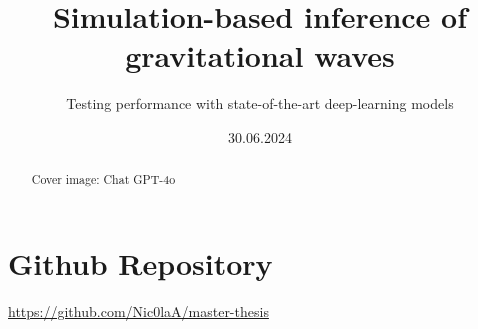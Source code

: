 \documentclass[ds,nofirstcompanypicture]{mscthesis}
\title{Simulation-based inference of gravitational waves}
\subtitle{Testing performance with state-of-the-art deep-learning models}
\date{30.06.2024}
\begin{document}
\pagestyle{plain}

\maketitlepage
\fixemptypage
\setcounter{page}{0}

\begin{abstract}
Cover image: Chat GPT-4o
\end{abstract}

\maketitle

\section*{Github Repository}
\url{https://github.com/Nic0laA/master-thesis}












\newpage

\end{document}
